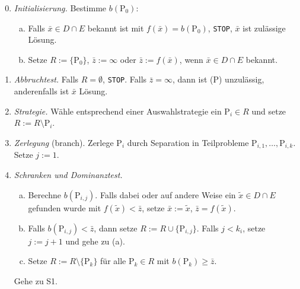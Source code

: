 \begin{enumerate}[S1]
  \setcounter{enumi}{-1}
\item \emph{Initialisierung.} Bestimme $b(\text{P}_0)$:
  \begin{enumerate}[(a)]
  \item Falls $\bar{x} \in D \cap E$ bekannt ist mit $f(\bar{x}) = b(\text{P}_0)$,
    \verb+STOP+, $\bar{x}$ ist zulässige Lösung.
  \item Setze $R := \{ \text{P}_0 \}$, $\bar{z} := \infty$ oder
    $\bar{z} := f( \bar{x} )$, wenn $\bar{x} \in D \cap E$ bekannt.
  \end{enumerate}
\item \emph{Abbruchtest.} Falls $R = \emptyset$, \verb+STOP+. Falls $\bar{z} =
  \infty$, dann ist (P) unzulässig, anderenfalls ist $\bar{x}$ Lösung.
\item \emph{Strategie.} Wähle entsprechend einer Auswahlstrategie ein
  $\text{P}_i \in R$ und setze $R := R \setminus \text{P}_i$.
\item \emph{Zerlegung} (branch). Zerlege $\text{P}_i$ durch Separation in
  Teilprobleme $\text{P}_{i,1}, \ldots, \text{P}_{i,k}$. Setze $j := 1$.
\item \emph{Schranken und Dominanztest.}
  \begin{enumerate}[(a)]
  \item Berechne $b(\text{P}_{i,j})$. Falls dabei oder auf andere Weise ein
    $\tilde{x} \in D \cap E$ gefunden wurde mit $f(\tilde{x}) < \bar{z}$, setze
    $\bar{x} :=  \tilde{x}$, $\bar{z} = f(\tilde{x})$.
  \item Falls $b(\text{P}_{i,j}) < \bar{z}$, dann setze $R := R \cup \{
    \text{P}_{i,j} \}$. Falls $j < k_i$, setze $j := j + 1$ und gehe zu (a).
  \item Setze $R := R \setminus \{\text{P}_k\}$ für alle $\text{P}_k \in R$ mit
    $b(\text{P}_k) \ge \bar{z}$.
  \end{enumerate}
  Gehe zu S1.
\end{enumerate}


